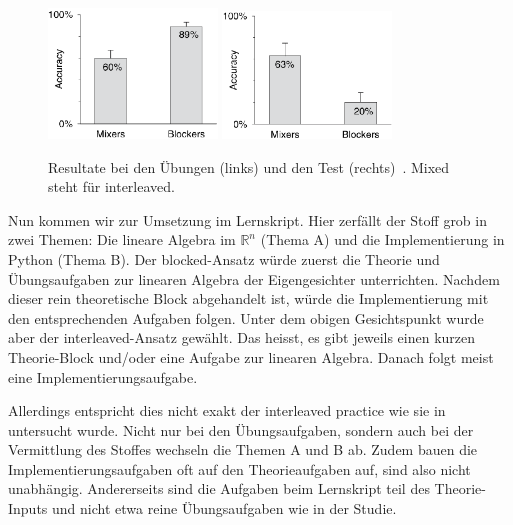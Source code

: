 \begin{figure}[ht]
	\centering
	\includegraphics[width=0.4\textwidth]{images/interleaved_practice}
	\hfill
	\includegraphics[width=0.4\textwidth]{images/interleaved_test}
	\caption{Resultate bei den Übungen (links) und den Test (rechts)~\cite{Rohrer2007}. \glqq{}Mixed\grqq{} steht für \glqq{}interleaved\grqq{}.}
	\label{fig:interleaved}
\end{figure}

Nun kommen wir zur Umsetzung im Lernskript.
Hier zerfällt der Stoff grob in zwei Themen: Die lineare Algebra im $\mathbb R^n$ (Thema A) und die Implementierung in Python (Thema B).
Der \glqq{}blocked\grqq{}-Ansatz würde zuerst die Theorie und Übungsaufgaben zur linearen Algebra der Eigengesichter unterrichten.
Nachdem dieser rein theoretische Block abgehandelt ist, würde die Implementierung mit den entsprechenden Aufgaben folgen.
Unter dem obigen Gesichtspunkt wurde aber der \glqq{}interleaved\grqq{}-Ansatz gewählt.
Das heisst, es gibt jeweils einen kurzen Theorie-Block und/oder eine Aufgabe zur linearen Algebra.
Danach folgt meist eine Implementierungsaufgabe.

Allerdings entspricht dies nicht exakt der \glqq{}interleaved practice\grqq{} wie sie in \cite{Rohrer2007} untersucht wurde.
Nicht nur bei den Übungsaufgaben, sondern auch bei der Vermittlung des Stoffes wechseln die Themen A und B ab.
Zudem bauen die Implementierungsaufgaben oft auf den Theorieaufgaben auf, sind also nicht unabhängig.
Andererseits sind die Aufgaben beim Lernskript teil des Theorie-Inputs und nicht etwa reine Übungsaufgaben wie in der Studie.